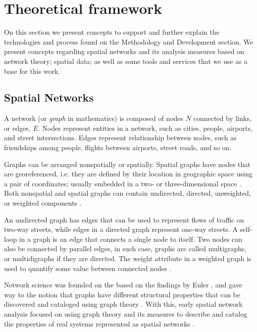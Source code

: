 \chapter{Theoretical framework}
\label{cha:chapter 2}

On this section we present concepts to support and further explain the technologies and process found on the Methodology and Development section. We present concepts regarding spatial networks and its analysis measures based on network theory; spatial data; as well as some tools and services that we use as a base for this work.

\section{Spatial Networks}
A network (or \textit{graph} in mathematics) is composed of nodes $N$ connected by links, or edges, $E$. Nodes represent entities in a network, such as cities, people, airports, and street intersections. Edges represent relationship between nodes, such as friendships among people, flights between airports, street roads, and so on. 

Graphs can be arranged nonspatially or spatially. Spatial graphs have nodes that are georeferenced, i.e. they are defined by their location in geographic space using a pair of coordinates; usually embedded in a two- or three-dimensional space \cite{barthelemy_spatial_2011}. Both nonspatial and spatial graphs can contain undirected, directed, unweighted, or weighted components \cite{anderson_2020}.

An undirected graph has edges that can be used to represent flows of traffic on two-way streets, while edges in a directed graph represent one-way streets. A self-loop in a graph is an edge that connects a single node to itself. Two nodes can also be connected by parallel edges, in such case, graphs are called multigraphs, or multidigraphs if they are directed. The weight attribute in a weighted graph is used to quantify some value between connected nodes \cite{boeing_osmnx_2017}.

Network science was founded on the based on the findings by Euler \cite{euler_1741}, and gave way to the notion that graphs have different structural properties that can be discovered and cataloged using graph theory \cite{barabasi_2016}. With this, early spatial network analysis focused on using graph theory and its measures to describe and catalog the properties of real systems represented as spatial networks \cite{anderson_2020}. 

